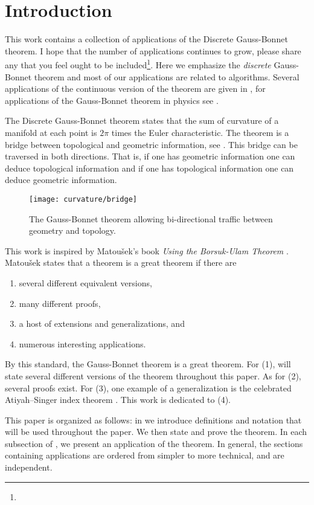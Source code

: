 \section{Introduction}
\label{sec:intro}

This work contains a collection of applications of the 
Discrete Gauss-Bonnet theorem.
I hope that the number of applications continues to grow,
please share any that you feel
ought to  be included\footnote{}.
Here we emphasize the \emph{discrete} Gauss-Bonnet
theorem and most of our applications are related to algorithms. 
Several applications of the continuous version of the theorem
are given in \cite{doc76,pressley_elementary_2010}, for applications of the Gauss-Bonnet 
theorem in physics see \cite{tirado-physics-apps}.

The Discrete Gauss-Bonnet theorem states that the sum of curvature
of a manifold at each point is $2\pi$ times the Euler characteristic.
The theorem is a bridge between topological
and geometric information, see . 
This bridge can be traversed in both directions.
That is, if one has geometric information one can deduce topological information and
if one has topological information one can deduce geometric information.


\begin{figure}[htb]
\centering
\texttt{[image: curvature/bridge]}
\caption{The Gauss-Bonnet theorem allowing bi-directional traffic
between geometry and topology.}
\label{fig:bridge}
\end{figure}

This work is inspired by Matou\v{s}ek's book \emph{Using the Borsuk-Ulam Theorem}
\cite{jm08}.
Matou\v{s}ek states that a theorem is a great theorem if there are
\begin{enumerate}[(1)]
\item several different equivalent versions,
\item many different proofs,
\item a host of extensions and generalizations, and
\item numerous interesting applications.
\end{enumerate}

By this standard, the Gauss-Bonnet theorem is a great theorem.
For (1), will state several different versions of the theorem throughout this paper.
As for (2), several proofs exist.
For (3), one example of a generalization is the celebrated Atiyah–Singer index 
theorem \cite{atiyah_index_1963}.
This work is dedicated to (4).

This paper is organized as follows:
in  we introduce definitions and notation that will be used
throughout the paper. We then state and prove the theorem.
In each subsection of , we present an application of the theorem.
In general, the sections containing applications are ordered from simpler to more technical,
and are independent.


